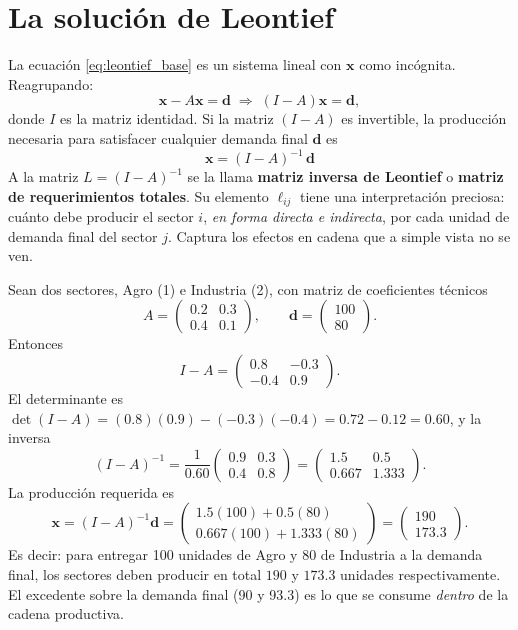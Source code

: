 \section{La solución de Leontief}

La ecuación \eqref{eq:leontief_base} es un sistema lineal con $\mathbf{x}$ como incógnita. Reagrupando:
\begin{equation}
\mathbf{x} - A\mathbf{x} = \mathbf{d} \;\Longrightarrow\; (I - A)\mathbf{x} = \mathbf{d},
\end{equation}
donde $I$ es la matriz identidad. Si la matriz $(I-A)$ es invertible, la producción necesaria para satisfacer cualquier demanda final $\mathbf{d}$ es
\begin{equation}
\boxed{\;\mathbf{x} = (I - A)^{-1}\,\mathbf{d}\;}
\label{eq:leontief_sol}
\end{equation}
A la matriz $L = (I-A)^{-1}$ se la llama \textbf{matriz inversa de Leontief} o \textbf{matriz de requerimientos totales}. Su elemento $\ell_{ij}$ tiene una interpretación preciosa: cuánto debe producir el sector $i$, \emph{en forma directa e indirecta}, por cada unidad de demanda final del sector $j$. Captura los efectos en cadena que a simple vista no se ven.

\begin{ejemplo}
Sean dos sectores, Agro (1) e Industria (2), con matriz de coeficientes técnicos
\[
A = \begin{pmatrix} 0.2 & 0.3 \\ 0.4 & 0.1 \end{pmatrix},
\qquad
\mathbf{d} = \begin{pmatrix} 100 \\ 80 \end{pmatrix}.
\]
Entonces
\[
I - A = \begin{pmatrix} 0.8 & -0.3 \\ -0.4 & 0.9 \end{pmatrix}.
\]
El determinante es $\det(I-A) = (0.8)(0.9) - (-0.3)(-0.4) = 0.72 - 0.12 = 0.60$, y la inversa
\[
(I-A)^{-1} = \frac{1}{0.60}\begin{pmatrix} 0.9 & 0.3 \\ 0.4 & 0.8 \end{pmatrix}
= \begin{pmatrix} 1.5 & 0.5 \\ 0.667 & 1.333 \end{pmatrix}.
\]
La producción requerida es
\[
\mathbf{x} = (I-A)^{-1}\mathbf{d}
= \begin{pmatrix} 1.5(100)+0.5(80) \\ 0.667(100)+1.333(80) \end{pmatrix}
= \begin{pmatrix} 190 \\ 173.3 \end{pmatrix}.
\]
Es decir: para entregar 100 unidades de Agro y 80 de Industria a la demanda final, los sectores deben producir en total \(190\) y \(173.3\) unidades respectivamente. El excedente sobre la demanda final (90 y 93.3) es lo que se consume \emph{dentro} de la cadena productiva.
\end{ejemplo}

